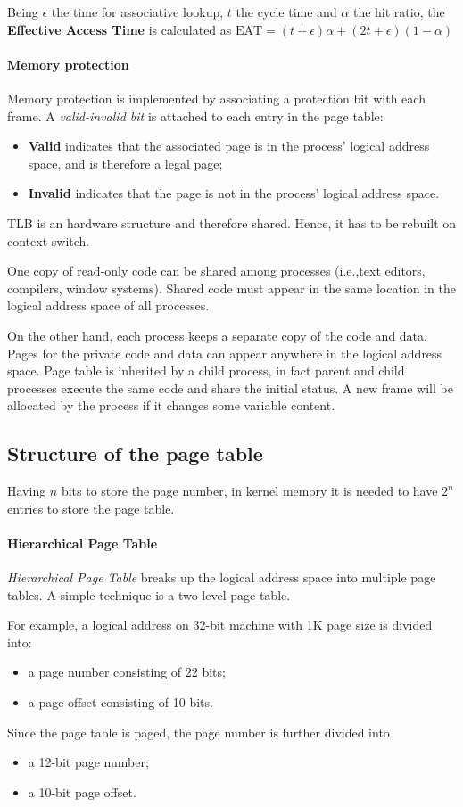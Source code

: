 Being $\epsilon$ the time for associative lookup, $t$  the cycle time and $\alpha$ the hit ratio, the \textbf{Effective Access Time} is calculated as $\text{EAT} = (t + \epsilon) \alpha + (2 t + \epsilon)(1 - \alpha)$

\paragraph{Memory protection} Memory protection is implemented by associating a protection bit with each frame. A \emph{valid-invalid bit} is attached to each entry in the page table:

\begin{itemize}
\item \textbf{Valid} indicates that the associated page is in the process' logical address space, and is therefore a legal page;
\item \textbf{Invalid} indicates that the page is not in the process' logical address space.
\end{itemize}
TLB is an hardware structure and therefore shared. Hence, it has to be rebuilt on context switch.

One copy of read-only code can be shared among processes (i.e.,\@ text editors, compilers, window systems). Shared code must appear in the same location in the logical address space of all processes.

On the other hand, each process keeps a separate copy of the code and data. Pages for the private code and data can appear anywhere in the logical address space. Page table is inherited by a child process, in fact parent and child processes execute the same code and share the initial status. A new frame will be allocated by the process if it changes some variable content.

\subsection{Structure of the page table}
Having $n$ bits to store the page number, in kernel memory it is needed to have $2^n$ entries to store the page table.
\paragraph{Hierarchical Page Table} \emph{Hierarchical Page Table} breaks up the logical address space into multiple page tables. A simple technique is a two-level page table.

For example, a logical address on 32-bit machine with 1K page size is divided into:
\begin{itemize}
\item a page number consisting of 22 bits;
\item a page offset consisting of 10 bits.
\end{itemize}
Since the page table is paged, the page number is further divided into
\begin{itemize}
\item a 12-bit page number;
\item a 10-bit page offset.
\end{itemize}

